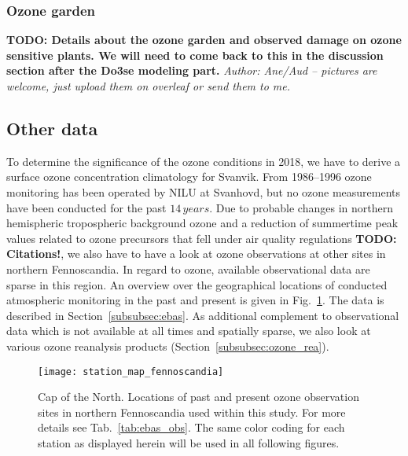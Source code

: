 \documentclass[bg, manuscript]{copernicus}
\begin{document}
\subsubsection{Ozone garden}
\label{subsubsec:ozone_garden}
      {\bf TODO: Details about the ozone garden and observed damage on ozone sensitive plants. We will need to come back to this in the discussion section after the Do3se modeling part.} \emph{Author: Ane/Aud -- pictures are welcome, just upload them on overleaf or send them to me.}



\subsection{Other data}
\label{subsec:other_data}
To determine the significance of the ozone conditions in 2018, we have to derive a surface ozone concentration climatology for Svanvik. From 1986--1996 ozone monitoring has been operated by NILU at Svanhovd, but no ozone measurements have been conducted for the past $14\,\unit{years}$. Due to probable changes in northern hemispheric tropospheric background ozone and a reduction of summertime peak values related to ozone precursors that fell under air quality regulations {\bf TODO: Citations!}, we also have to have a look at ozone observations at other sites in northern Fennoscandia. In regard to ozone, available observational data are sparse in this region. An overview over the geographical locations of conducted atmospheric monitoring in the past and present is given in Fig.~\ref{fig:station_map_fennoscandia}. The data is described in Section~\ref{subsubsec:ebas}. 
As additional complement to observational data which is not available at all times and spatially sparse, we also look at various ozone reanalysis products (Section~\ref{subsubsec:ozone_rea}).

\begin{figure}[t]
  \texttt{[image: station\_map\_fennoscandia]}
  \caption{Cap of the North. Locations of past and present ozone observation sites in northern Fennoscandia used within this study. For more details see Tab.~\ref{tab:ebas_obs}. The same color coding for each station as displayed herein will be used in all following figures.}
  \label{fig:station_map_fennoscandia}
\end{figure}
\end{document}
